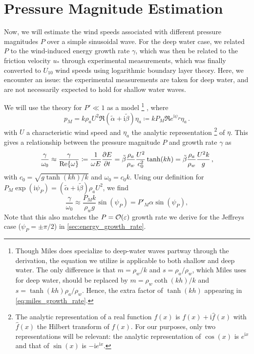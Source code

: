 \documentclass{jfm}
\newcommand{\im}{\mathrm{i}}
\renewcommand*{\epsilon}{\varepsilon}
\begin{document}
\section{Pressure Magnitude Estimation}
Now, we will estimate the wind speeds associated with different pressure
magnitudes $P$ over a simple sinusoidal wave.
For the deep water case, we related $P$ to the wind-induced energy growth
rate $\gamma$, which was then be related to the friction velocity $u_*$
through experimental measurements, which was finally converted to
$U_{10}$ wind speeds using logarithmic boundary layer theory.
Here, we encounter an issue: the experimental measurements are taken for
deep water, and are not necessarily expected to hold for shallow water
waves.

We will use the \citet{miles1957generation} theory for $P' \ll 1$ as a model%
\footnote{
  Though Miles does specialize to deep-water waves partway through the
  derivation, the equation we utilize is applicable to both shallow and
  deep water.
  The only difference is that $m = \rho_w/k$ and $s=\rho_a/\rho_w$,
  which Miles uses for deep water, should be replaced by
  $m=\rho_w\coth(kh)/k$ and $s = \tanh(kh) \rho_a/\rho_w$.
  Hence, the extra factor of $\tanh(kh)$ appearing in
  \cref{eq:miles_growth_rate}.
}%
, where
\begin{equation}
  p_M = k \rho_a U^2 \Re{(\tilde{\alpha} + \im \tilde{\beta}) \eta_a}
  \coloneqq k P_M \Re{ e^{\im \psi_P} \eta_a} \,.
\end{equation}
with $U$ a characteristic wind speed and $\eta_a$ the analytic
representation%
\footnote{
  The analytic representation of a real function $f(x)$ is $f(x) + \im
  \hat{f}(x)$ with $\hat{f}(x)$ the Hilbert transform of $f(x)$.
  For our purposes, only two representations will be relevant: the
  analytic representation of $\cos(x)$ is $e^{\im x}$ and that of
  $\sin(x)$ is $-\im e^{\im x}$.
}
of $\eta$.
This gives a relationship between the pressure magnitude $P$ and growth
rate $\gamma$ as
\begin{equation}
  \frac{\gamma}{\omega_0} \approx \frac{\gamma}{\Re{\omega}} \coloneqq
  \frac{1}{\omega E} \pdv{E}{t}
  = \tilde{\beta} \frac{\rho_a}{\rho_w} \frac{U^2}{c_0^2} \tanh(kh)
  = \tilde{\beta} \frac{\rho_a}{\rho_w} \frac{U^2 k}{g} \,,
  \label{eq:miles_growth_rate}
\end{equation}
with $c_0 = \sqrt{g\tanh(kh)/k}$ and $\omega_0 = c_0 k$.
Using our definition for $P_M \exp(\im \psi_P) = (\tilde{\alpha} + \im
\tilde{\beta}) \rho_a U^2$, we find
\begin{equation}
  \frac{\gamma}{\omega_0} \approx \frac{P_M k}{\rho_w g} \sin(\psi_P)
  = P'_M \alpha \sin(\psi_P)
  ,
\end{equation}
Note that this also matches the $P = \order{\epsilon}$ growth rate we
derive for the Jeffreys case (\ie $\psi_P = \pm \pi/2$) in
\cref{sec:energy_growth_rate}.
\end{document}
